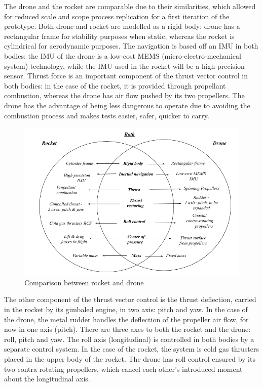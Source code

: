 The drone and the rocket are comparable due to their similarities, which allowed for reduced scale and scope  process replication for a first iteration of the prototype. Both drone and rocket are modelled as a rigid body: drone has a rectangular frame for stability purposes when static, whereas the rocket is cylindrical for aerodynamic purposes. The navigation is based off an IMU in both bodies: the IMU of the drone is a low-cost MEMS (micro-electro-mechanical system) technology, while the IMU used in the rocket will be a high precision sensor. 
Thrust force is an important component of the thrust vector control in both bodies: in the case of the rocket, it is provided through propellant combustion, whereas the drone has air flow pushed by its two propellers. 
The drone has the advantage of being less dangerous to operate due to avoiding the combustion process and makes tests easier, safer, quicker to carry. 

\begin{figure}[H]
  \includegraphics[scale=0.9]{graphics/Diagram.png}
  \caption{Comparison between rocket and drone}
  \label{diagramcomparison}
\end{figure}

The other component of the thrust vector control is the thrust deflection, carried in the rocket by its gimbaled engine, in two axis: pitch and yaw. 
In the case of the drone, the metal rudder handles the deflection of the propeller air flow, for now in one axis (pitch). There are three axes to both the rocket and the drone: roll, pitch and yaw. The roll axis (longitudinal) is controlled in both bodies by a separate control system. In the case of the rocket, the system is cold gas thrusters placed in the upper body of the rocket. 
The drone has roll control ensured by its two contra rotating propellers, which cancel each other’s introduced moment about the longitudinal axis. 

